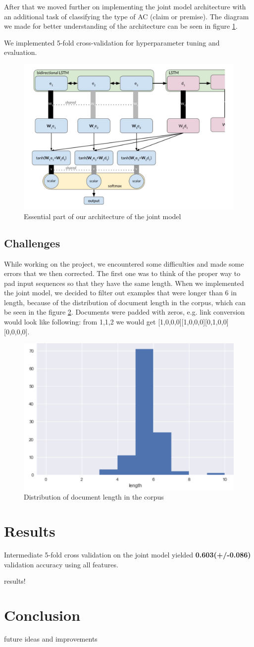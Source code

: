 \documentclass[onecolumn]{article}
\begin{document}
After that we moved further on implementing the joint model architecture with an additional task of classifying the type of AC (claim or premise). 
The diagram we made for better understanding of the architecture can be seen in figure \ref{fig:our-model}.

We implemented 5-fold cross-validation for hyperparameter tuning and evaluation.
\begin{figure}[h]
    \centering
    \includegraphics[width=0.8\linewidth]{fig/architecture.png}
    \caption{Essential part of our architecture of the joint model}
    \label{fig:our-model}
        \end{figure}

\subsection{Challenges}
While working on the project, we encountered some difficulties and made some errors that we then corrected. The first one 
was to think of the proper way to pad input sequences so that they have the same length. When we implemented the joint model, 
we decided to filter out examples that were longer than 6 in length, because of the distribution of document length in the corpus, which
can be seen in the figure \ref{fig:length}. Documents were padded with zeros, e.g. link conversion would look like following: 
from 1,1,2 we would get [1,0,0,0][1,0,0,0][0,1,0,0][0,0,0,0].


\begin{figure}[h]
    \centering
    \includegraphics[width=0.4\linewidth]{fig/doc-length.png}
    \caption{Distribution of document length in the corpus}
    \label{fig:length}
        \end{figure}




\section{Results}
Intermediate 5-fold cross validation on the joint model yielded \textbf{0.603(+/-0.086)} validation accuracy using all features. 

results!

\section{Conclusion}
future ideas and improvements

\nocite{*}


\end{document}
